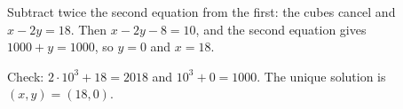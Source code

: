 Subtract twice the second equation from the first: the cubes cancel and $x-2y=18$. Then $x-2y-8=10$, and the second equation gives $1000+y=1000$, so $y=0$ and $x=18$.

Check: $2\cdot10^3+18=2018$ and $10^3+0=1000$. The unique solution is $\boxed{(x,y)=(18,0)}$.
